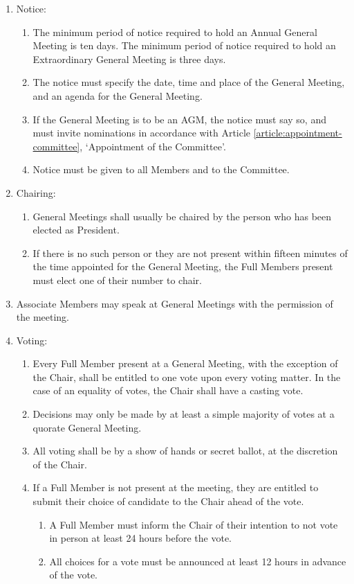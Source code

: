 \documentclass[12pt]{constitution}
\begin{document}
\begin{enumerate}
    \item Notice:
    \begin{enumerate}
        \item The minimum period of notice required to hold an Annual General Meeting is ten days.  The minimum period of notice required to hold an Extraordinary General Meeting is three days.
        \item The notice must specify the date, time and place of the General Meeting, and an agenda for the General Meeting.
        \item If the General Meeting is to be an AGM, the notice must say so, and must invite nominations in accordance with Article \ref{article:appointment-committee}, `Appointment of the Committee'.
        \item Notice must be given to all Members and to the Committee.
    \end{enumerate}

    \item Chairing:
    \begin{enumerate}
        \item General Meetings shall usually be chaired by the person who has been elected as President.
        \item If there is no such person or they are not present within fifteen minutes of the time appointed for the General Meeting, the Full Members present must elect one of their number to chair.
    \end{enumerate}

    \item Associate Members may speak at General Meetings with the permission of the meeting.

    \item Voting:
    \begin{enumerate}
        \item Every Full Member present at a General Meeting, with the exception of the Chair, shall be entitled to one vote upon every voting matter.  In the case of an equality of votes, the Chair shall have a casting vote.
        \item Decisions may only be made by at least a simple majority of votes at a quorate General Meeting.
        \item All voting shall be by a show of hands or secret ballot, at the discretion of the Chair.
        \item If a Full Member is not present at the meeting, they are entitled to submit their choice of candidate to the Chair ahead of the vote.
        \begin{enumerate}
            \item A Full Member must inform the Chair of their intention to not vote in person at least 24 hours before the vote.
            \item All choices for a vote must be announced at least 12 hours in advance of the vote.
        \end{enumerate}
    \end{enumerate}


\end{enumerate}
\end{document}
